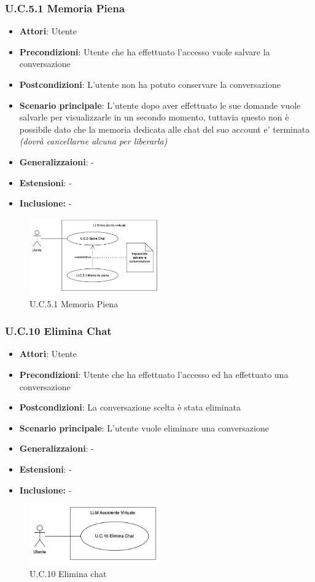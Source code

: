 \subsubsection{U.C.5.1 Memoria Piena}
\begin{itemize}
    \item \textbf{Attori}: Utente
    \item \textbf{Precondizioni}: Utente che ha effettuato l'accesso vuole salvare la conversazione
    \item \textbf{Postcondizioni}: L'utente non ha potuto conservare la conversazione
    \item \textbf{Scenario principale}: L’utente dopo aver effettuato le sue domande vuole salvarle per visualizzarle in un secondo momento, tuttavia questo non è possibile dato che la memoria dedicata alle chat del suo account e’ terminata \textit{(dovrà cancellarne alcuna per liberarla)}
    \item \textbf{Generalizzaioni}: -
    \item \textbf{Estensioni}: -
    \item \textbf{Inclusione:} -
\end{itemize}
\begin{figure}[h!]
    \centering
    \includegraphics[width=0.5\textwidth]{img/UC5-1.png}
    \caption{U.C.5.1 Memoria Piena}
\end{figure}
\subsubsection{U.C.10 Elimina Chat}
\begin{itemize}
    \item \textbf{Attori}: Utente
    \item \textbf{Precondizioni}: Utente che ha effettuato l'accesso ed ha effettuato una conversazione
    \item \textbf{Postcondizioni}: La conversazione scelta è stata eliminata
    \item \textbf{Scenario principale}: L'utente vuole eliminare una conversazione
    \item \textbf{Generalizzaioni}: -
    \item \textbf{Estensioni}: -
    \item \textbf{Inclusione:} -
\end{itemize}
\begin{figure}[h!]
    \centering
    \includegraphics[width=0.5\textwidth]{img/UC10.png}
    \caption{U.C.10 Elimina chat}
\end{figure}
\newpage
